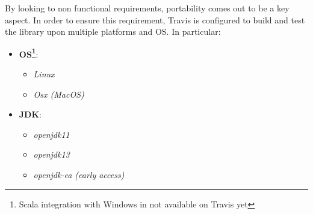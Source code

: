 By looking to non functional requirements, portability comes out to be a key aspect. In order to ensure this requirement, Travis is configured to build and test the library upon multiple platforms and OS. In particular:
\begin{itemize}
\item \textbf{OS\footnote{Scala integration with Windows in not available on Travis yet}}: 
  \begin{itemize}
  \item \textit{Linux}
  \item \textit{Osx (MacOS)}
  \end{itemize}
\item \textbf{JDK}:
  \begin{itemize}
  \item \textit{openjdk11}
  \item \textit{openjdk13}
  \item \textit{openjdk-ea (early access)}
  \end{itemize} 
\end{itemize}  











 